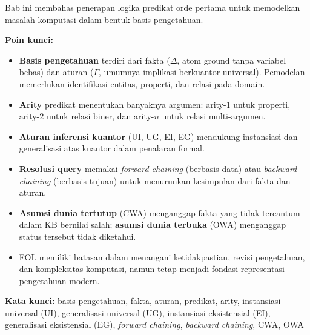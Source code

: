 \documentclass[../main]{subfiles}
\begin{document}

\begin{rangkuman}
Bab ini membahas penerapan logika predikat orde pertama untuk memodelkan masalah komputasi dalam bentuk basis pengetahuan.

\textbf{Poin kunci:}
\begin{itemize}
  \item \textbf{Basis pengetahuan} terdiri dari fakta ($\Delta$, atom ground tanpa variabel bebas) dan aturan ($\Gamma$, umumnya implikasi berkuantor universal). Pemodelan memerlukan identifikasi entitas, properti, dan relasi pada domain.
  \item \textbf{Arity} predikat menentukan banyaknya argumen: arity-1 untuk properti, arity-2 untuk relasi biner, dan arity-$n$ untuk relasi multi-argumen.
  \item \textbf{Aturan inferensi kuantor} (UI, UG, EI, EG) mendukung instansiasi dan generalisasi atas kuantor dalam penalaran formal.
  \item \textbf{Resolusi query} memakai \textit{forward chaining} (berbasis data) atau \textit{backward chaining} (berbasis tujuan) untuk menurunkan kesimpulan dari fakta dan aturan.
  \item \textbf{Asumsi dunia tertutup} (CWA) menganggap fakta yang tidak tercantum dalam KB bernilai salah; \textbf{asumsi dunia terbuka} (OWA) menganggap status tersebut tidak diketahui.
  \item FOL memiliki batasan dalam menangani ketidakpastian, revisi pengetahuan, dan kompleksitas komputasi, namun tetap menjadi fondasi representasi pengetahuan modern.
\end{itemize}

\textbf{Kata kunci:} basis pengetahuan, fakta, aturan, predikat, arity, instansiasi universal (UI), generalisasi universal (UG), instansiasi eksistensial (EI), generalisasi eksistensial (EG), \textit{forward chaining}, \textit{backward chaining}, CWA, OWA
\end{rangkuman}

\ifSubfilesClassLoaded{
  \renewcommand{\bibname}{Daftar Pustaka}
  
  
}{}
\end{document}
